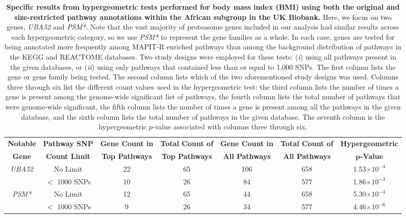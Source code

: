 \documentclass[10pt]{article}
\begin{document}
\begin{table}[H]
\centering
\hspace*{-2.5cm}
\begin{tabular}{|c|c|c|c|c|c|c|}
  \hline
  \textbf{Notable} & \textbf{Pathway SNP} & \textbf{Gene Count in} & \textbf{Total Count of} & \textbf{Gene Count in} & \textbf{Total Count of} & \textbf{Hypergeometric} \\
 \textbf{Gene} & \textbf{Count Limit} & \textbf{Top Pathways} & \textbf{Top Pathways} & \textbf{All Pathways} & \textbf{All Pathways} & \textbf{$\bm{p}$-Value} \\[2pt]
  \hline
 \multirow{2}{*}{\textit{UBA52}} & No Limit & 22 & 65 & 106 & 658 & 1.53$\times10^{-4}$ \\ [2pt] \cline{2-7}
 & $<$ 1000 SNPs & 10 & 26 & 84 & 577 & 1.86$\times10^{-3}$ \\ [2pt]\hline
\multirow{2}{*}{\textit{PSM*}} & No Limit & 12 & 65 & 44 & 658 & 5.30$\times10^{-4}$ \\ [2pt] \cline{2-7}
 & $<$ 1000 SNPs & 9 & 26 & 34 & 577 & 4.46$\times10^{-6}$ \\ [2pt]
   \hline
\end{tabular}
\caption[TBD]{\textbf{Specific results from hypergeometric tests performed for body mass index (BMI) using both the original and size-restricted pathway annotations within the African subgroup in the UK Biobank.} Here, we focus on two genes, \textit{UBA52} and \textit{PSM*}. Note that the vast majority of proteasome genes included in our analysis had similar results across each hypergeometric category, so we use \textit{PSM*} to represent the gene families as a whole. In each case, genes are tested for being annotated more frequently among MAPIT-R enriched pathways than among the background distribution of pathways in the KEGG and REACTOME databases. Two study designs were employed for these tests: (\textit{i}) using all pathways present in the given databases, or (\textit{ii}) using only pathways that contained less than or equal to 1,000 SNPs. The first column lists the gene or gene family being tested. The second column lists which of the two aforementioned study designs was used. Columns three through six list the different count values used in the hypergeometric test: the third column lists the number of times a gene is present among the genome-wide significant list of pathways, the fourth column lists the total number of pathways that were genome-wide significant, the fifth column lists the number of times a gene is present among all the pathways in the given database, and the sixth column lists the total number of pathways in the given database. The seventh column is the hypergeometric $p$-value associated with columns three through six.}
\label{InterPath-Supp-Table-AllPops-TopGeneCount-HypergeometricTests}
\end{table}
\end{document}
